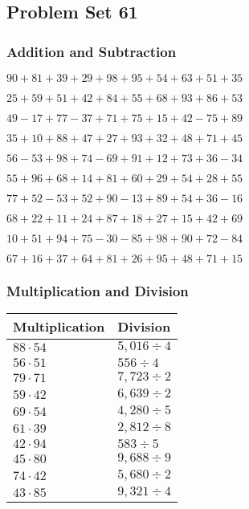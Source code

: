 \hypertarget{problem-set-61}{%
\subsection{Problem Set 61}\label{problem-set-61}}

\hypertarget{addition-and-subtraction}{%
\subsubsection{Addition and
Subtraction}\label{addition-and-subtraction}}

\(90+81+39+29+98+95+54+63+51+35\)

\(25+59+51+42+84+55+68+93+86+53\)

\(49-17+77-37+71+75+15+42-75+89\)

\(35+10+88+47+27+93+32+48+71+45\)

\(56-53+98+74-69+91+12+73+36-34\)

\(55+96+68+14+81+60+29+54+28+55\)

\(77+52-53+52+90-13+89+54+36-16\)

\(68+22+11+24+87+18+27+15+42+69\)

\(10+51+94+75-30-85+98+90+72-84\)

\(67+16+37+64+81+26+95+48+71+15\)

\hypertarget{multiplication-and-division}{%
\subsubsection{Multiplication and
Division}\label{multiplication-and-division}}

\begin{longtable}[]{@{}ll@{}}
\toprule
Multiplication & Division\tabularnewline
\midrule
\endhead
\(88\cdot54\) & \(5,016÷4\)\tabularnewline
\(56\cdot51\) & \(556÷4\)\tabularnewline
\(79\cdot71\) & \(7,723÷2\)\tabularnewline
\(59\cdot42\) & \(6,639÷2\)\tabularnewline
\(69\cdot54\) & \(4,280÷5\)\tabularnewline
\(61\cdot39\) & \(2,812 ÷8\)\tabularnewline
\(42\cdot94\) & \(583÷5\)\tabularnewline
\(45\cdot80\) & \(9,688÷9\)\tabularnewline
\(74\cdot42\) & \(5,680÷2\)\tabularnewline
\(43\cdot85\) & \(9,321÷4\)\tabularnewline
\bottomrule
\end{longtable}
